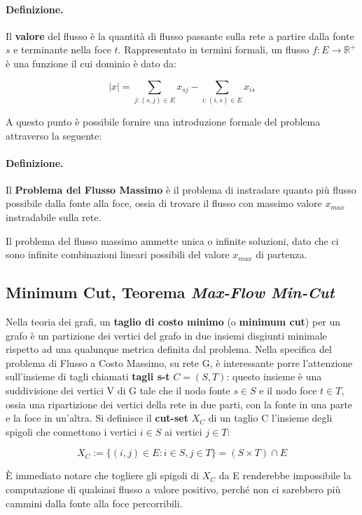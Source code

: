 \documentclass{article}
\begin{document}
\paragraph{Definizione.} Il \textbf{valore} del flusso è la quantità di flusso passante sulla rete a partire dalla fonte $s$ e terminante nella foce $t$. Rappresentato in 
termini formali, un flusso $f : E \rightarrow \mathbb{R}^+$ è una funzione il cui dominio è dato da:

\[ \lvert x \rvert = \sum_{j: (s,j) \in E} x_{sj} - \sum_{i: (i,s) \in E} x_{is}\]

A questo punto è possibile fornire una introduzione formale del problema attraverso la seguente:\\
\pagebreak

\paragraph{Definizione.} Il \textbf{Problema del Flusso Massimo} è il problema di instradare quanto più flusso possibile dalla fonte alla foce, ossia di trovare il flusso con massimo valore $x_{max}$ instradabile sulla rete.

Il problema del flusso massimo ammette unica o infinite soluzioni, dato che ci sono infinite combinazioni lineari possibili del valore $x_{max}$ di partenza.


\subsection{Minimum Cut, Teorema \emph{Max-Flow Min-Cut}} \label{min-cut}
Nella teoria dei grafi, un \textbf{taglio di costo minimo} (o \textbf{minimum cut}) per un grafo è un partizione dei vertici del grafo in due insiemi disgiunti minimale rispetto
ad una qualunque metrica definita dal problema. Nella specifica del problema di Flusso a Costo Massimo, su rete G, è interessante porre l'attenzione sull'insieme di tagli chiamati 
\textbf{tagli s-t} $C = (S,T)$: questo insieme è una suddivisione dei vertici V di G tale che il nodo fonte $s \in S$ e il nodo foce $t \in T$, ossia una ripartizione dei vertici
della rete in due parti, con la fonte in una parte e la foce in un'altra. 
Si definisce il \textbf{cut-set} $X_C$ di un taglio C l'insieme degli spigoli che connettono i vertici $i \in S$ ai vertici $j \in T$:

\[X_C := \{(i, j) \in E : i \in S, j \in T \} = (S \times T) \cap E\]

È immediato notare che togliere gli spigoli di $X_C$ da E renderebbe impossibile la computazione di qualsiasi flusso a valore positivo, perché non ci sarebbero più cammini dalla 
fonte alla foce percorribili.
\end{document}
